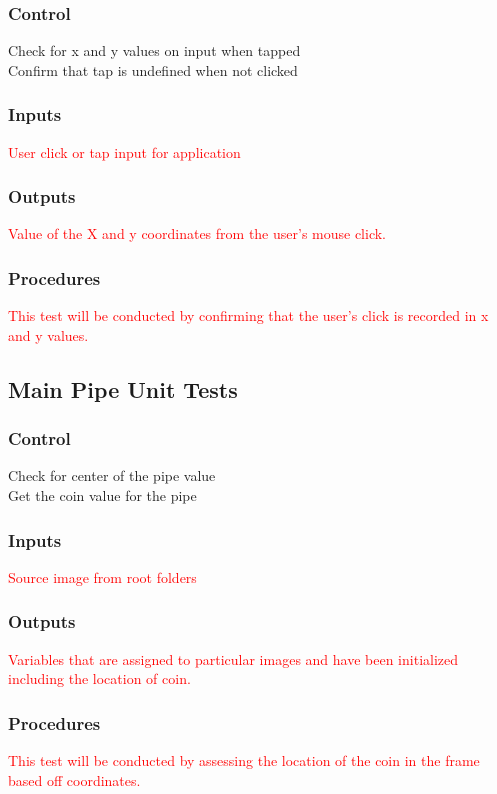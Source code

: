 \documentclass[11pt, oneside]{article}   	%
\begin{document}
\subsubsection{Control}
Check for x and y values on input when tapped\\
Confirm that tap is undefined when not clicked

\subsubsection{Inputs}
\textcolor{red}{User click or tap input for application}

\subsubsection{Outputs}
\textcolor{red}{Value of the X and y coordinates from the user's mouse click.}

\subsubsection{Procedures}
\textcolor{red}{This test will be conducted by confirming that the user's click is recorded in x and y values.}


\subsection{Main Pipe Unit Tests}
\subsubsection{Control}
Check for center of the pipe value \\
Get the coin value for the pipe

\subsubsection{Inputs}
\textcolor{red}{Source image from root folders}

\subsubsection{Outputs}
\textcolor{red}{Variables that are assigned to particular images and have been initialized including the location of coin.}

\subsubsection{Procedures}
\textcolor{red}{This test will be conducted by assessing the location of the coin in the frame based off coordinates.}
\end{document}
